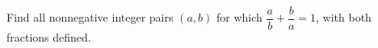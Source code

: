Find all nonnegative integer pairs $(a,b)$ for which $\dfrac{a}{b}+\dfrac{b}{a}=1$, with both fractions defined.
